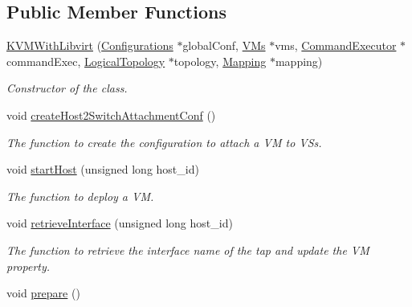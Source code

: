 \subsection*{\-Public \-Member \-Functions}
\begin{DoxyCompactItemize}
\item 
\hyperlink{classKVMWithLibvirt_a0e64758e02ef58e760c1cd8712d8b728}{\-K\-V\-M\-With\-Libvirt} (\hyperlink{classConfigurations}{\-Configurations} $\ast$global\-Conf, \hyperlink{classVMs}{\-V\-Ms} $\ast$vms, \hyperlink{classCommandExecutor}{\-Command\-Executor} $\ast$command\-Exec, \hyperlink{classLogicalTopology}{\-Logical\-Topology} $\ast$topology, \hyperlink{classMapping}{\-Mapping} $\ast$mapping)
\begin{DoxyCompactList}\small\item\em \-Constructor of the class. \end{DoxyCompactList}\item 
\hypertarget{classKVMWithLibvirt_a60d9bb868861d9f82bfa0e128037aa77}{void \hyperlink{classKVMWithLibvirt_a60d9bb868861d9f82bfa0e128037aa77}{create\-Host2\-Switch\-Attachment\-Conf} ()}\label{classKVMWithLibvirt_a60d9bb868861d9f82bfa0e128037aa77}

\begin{DoxyCompactList}\small\item\em \-The function to create the configuration to attach a \-V\-M to \-V\-Ss. \end{DoxyCompactList}\item 
void \hyperlink{classKVMWithLibvirt_a0a8b035f4472bb586c32eb9f2c42adff}{start\-Host} (unsigned long host\-\_\-id)
\begin{DoxyCompactList}\small\item\em \-The function to deploy a \-V\-M. \end{DoxyCompactList}\item 
void \hyperlink{classKVMWithLibvirt_a71eeb177804ff7fca2834f28a7163702}{retrieve\-Interface} (unsigned long host\-\_\-id)
\begin{DoxyCompactList}\small\item\em \-The function to retrieve the interface name of the tap and update the \-V\-M property. \end{DoxyCompactList}\item 
\hypertarget{classKVMWithLibvirt_a789576619203856a47073c657f55f678}{void \hyperlink{classKVMWithLibvirt_a789576619203856a47073c657f55f678}{prepare} ()}\label{classKVMWithLibvirt_a789576619203856a47073c657f55f678}


\end{DoxyCompactItemize}

